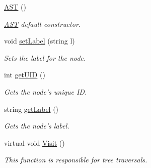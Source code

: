 \begin{DoxyCompactItemize}
\hyperlink{classAST_afd378ca7cb3049d6293e8597d31d758d}{A\-S\-T} ()
\begin{DoxyCompactList}\small\item\em \hyperlink{classAST}{A\-S\-T} default constructor. \end{DoxyCompactList}\item 
void \hyperlink{classAST_a71d680856e95ff89f55d5311a552eba6}{set\-Label} (string l)
\begin{DoxyCompactList}\small\item\em Sets the label for the node. \end{DoxyCompactList}\item 
int \hyperlink{classAST_ab7a5b1d9f1c2de0d98deb356f724a42c}{get\-U\-I\-D} ()
\begin{DoxyCompactList}\small\item\em Gets the node's unique I\-D. \end{DoxyCompactList}\item 
string \hyperlink{classAST_aee029be902fffc927d16ccb03eb922ad}{get\-Label} ()
\begin{DoxyCompactList}\small\item\em Gets the node's label. \end{DoxyCompactList}\item 
virtual void \hyperlink{classAST_a5828cc86f2c4f1a0aeab6d7069e8fd82}{Visit} ()
\begin{DoxyCompactList}\small\item\em This function is responsible for tree traversals. \end{DoxyCompactList}\end{DoxyCompactItemize}
